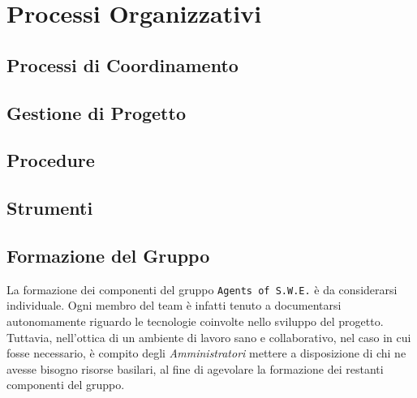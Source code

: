 \section{Processi Organizzativi}\label{ProcessiOrganizzativi}

\subsection{Processi di Coordinamento}\label{ProcessiOrganizzativi_ProcessiCoordinamento}


\subsection{Gestione di Progetto}\label{ProcessiOrganizzativi_GestioneProgetto}


\subsection{Procedure}\label{ProcessiOrganizzativi_Procedure}


\subsection{Strumenti}\label{ProcessiOrganizzativi_Strumenti}


\subsection{Formazione del Gruppo}\label{ProcessiOrganizzativi_FormazioneGruppo}
	La formazione dei componenti del gruppo \texttt{Agents of S.W.E.} è da considerarsi individuale. Ogni membro del 			team è infatti tenuto a documentarsi autonomamente riguardo le tecnologie coinvolte nello sviluppo del 								progetto\glossario. Tuttavia, nell'ottica di un ambiente di lavoro sano e collaborativo, nel caso in cui fosse 				necessario, è compito degli \textit{Amministratori} mettere a disposizione di chi ne avesse bisogno risorse 						basilari, al fine di	agevolare la formazione dei restanti componenti del gruppo.
